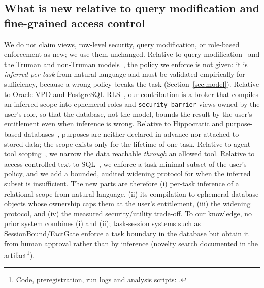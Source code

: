 \subsection{What is new relative to query modification and fine-grained access control}
\label{sec:whatsnew}
We do not claim views, row-level security, query modification, or role-based enforcement as new; we use
them unchanged. Relative to query modification~\cite{stonebraker1975query} and the Truman and non-Truman
models~\cite{rizvi2004extending}, the policy we enforce is not given: it is \emph{inferred per task} from
natural language and must be validated empirically for sufficiency, because a wrong policy breaks the
task (Section~\ref{sec:model}). Relative to Oracle VPD and PostgreSQL RLS~\cite{oraclevpd,pgrls}, our
contribution is a broker that compiles an inferred scope into ephemeral roles and \texttt{security\_barrier}
views owned by the user's role, so that the database, not the model, bounds the result by the user's
entitlement even when inference is wrong. Relative to Hippocratic and purpose-based
databases~\cite{agrawal2002hippocratic,byun2008purpose}, purposes are neither declared in advance nor
attached to stored data; the scope exists only for the lifetime of one task. Relative to agent tool
scoping~\cite{zhu2025miniscope,shi2025progent,cai2025agentsentry,zhu2026igac,zheng2026intentcap}, we
narrow the data reachable \emph{through} an allowed tool. Relative to access-controlled
text-to-SQL~\cite{fei2026rbac,klisura2026role,miyamoto2026pccsql,kim2026securemcp}, we enforce a
task-minimal subset of the user's policy, and we add a bounded, audited widening protocol for when the
inferred subset is insufficient. The new parts are therefore (i) per-task inference of a relational scope
from natural language, (ii) its compilation to ephemeral database objects whose ownership caps them at the
user's entitlement, (iii) the widening protocol, and (iv) the measured security/utility trade-off. To our
knowledge, no prior system combines (i) and (ii); task-session systems such as SessionBound/FactGate enforce a
task boundary in the database but obtain it from human approval rather than by inference (novelty search documented in the artifact\footnote{Code, preregistration, run logs and analysis scripts: \artifacturl.}).

